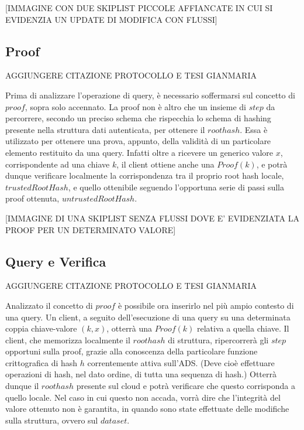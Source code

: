 		[IMMAGINE CON DUE SKIPLIST PICCOLE AFFIANCATE IN CUI SI EVIDENZIA UN UPDATE DI MODIFICA CON FLUSSI]
					
	\subsection{Proof}
		

		{AGGIUNGERE CITAZIONE PROTOCOLLO E TESI GIANMARIA}

		Prima di analizzare l'operazione di query, è necessario soffermarsi sul concetto di $ proof $, sopra solo accennato. La proof non è altro che un insieme di $ step $ da percorrere, secondo un preciso schema che rispecchia lo schema di hashing presente nella struttura dati autenticata, per ottenere il $ root hash $. Essa è utilizzato per ottenere una prova, appunto, della validità di un particolare elemento restituito da una query. Infatti oltre a ricevere un generico valore $ x $, corrispondente ad una chiave $ k $, il client ottiene anche una $ Proof(k) $, e potrà dunque verificare localmente la corrispondenza tra il proprio root hash locale, $ trusted Root Hash $, e quello ottenibile seguendo l'opportuna serie di passi sulla proof ottenuta, $ untrusted Root Hash $.
		
		[IMMAGINE DI UNA SKIPLIST SENZA FLUSSI DOVE E' EVIDENZIATA LA PROOF PER UN DETERMINATO VALORE]
 		
	\subsection{Query e Verifica}
	

		{AGGIUNGERE CITAZIONE PROTOCOLLO E TESI GIANMARIA}
	
		Analizzato il concetto di $ proof $ è possibile ora inserirlo nel più ampio contesto di una query. Un client, a seguito dell'esecuzione di una query su una determinata coppia chiave-valore $ (k,x) $, otterrà una $ Proof(k) $ relativa a quella chiave. Il client, che memorizza localmente il $ root hash $ di struttura, ripercorrerà gli $ step $ opportuni sulla proof, grazie alla conoscenza della particolare funzione crittografica di hash $ h $ correntemente attiva sull'ADS. (Deve cioè effettuare operazioni di hash, nel dato ordine, di tutta una sequenza di hash.) Otterrà dunque il $ root hash $ presente sul cloud e potrà verificare che questo corrisponda a quello locale. Nel caso in cui questo non accada, vorrà dire che l'integrità del valore ottenuto non è garantita, in quando sono state effettuate delle modifiche sulla struttura, ovvero sul $ dataset $. 
			
